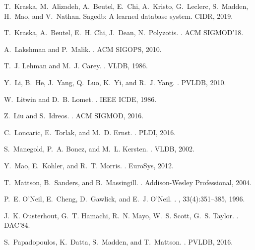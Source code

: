 \documentclass[11pt]{article}
\begin{document}
\begin{thebibliography}{10}
\begin{small}
T.~Kraska, M.~Alizadeh, A.~Beutel, E.~Chi, A.~Kristo, G.~Leclerc, S.~Madden,
  H.~Mao, and V.~Nathan.
\newblock Sagedb: A learned database system.
\newblock CIDR, 2019.

T.~Kraska, A.~Beutel, E.~H. Chi, J.~Dean, N.~Polyzotis.
.
\newblock ACM SIGMOD'18.

A.~Lakshman and P.~Malik.
.
\newblock ACM SIGOPS, 2010.

T.~J. Lehman and M.~J. Carey.
.
\newblock VLDB, 1986.

Y.~Li, B.~He, J.~Yang, Q.~Luo, K.~Yi, and R.~J. Yang.
.
\newblock PVLDB, 2010.

W.~Litwin and D.~B. Lomet.
.
\newblock IEEE ICDE, 1986.

Z.~Liu and S.~Idreos.
.
\newblock ACM SIGMOD, 2016.

C.~Loncaric, E.~Torlak, and M.~D. Ernst.
.
\newblock PLDI, 2016.

S.~Manegold, P.~A. Boncz, and M.~L. Kersten.
.
\newblock VLDB, 2002.

Y.~Mao, E.~Kohler, and R.~T. Morris.
.
\newblock EuroSys, 2012.

T.~Mattson, B.~Sanders, and B.~Massingill.
.
\newblock Addison-Wesley Professional, 2004.

P.~E. O'Neil, E.~Cheng, D.~Gawlick, and E.~J. O'Neil.
.
, 33(4):351--385, 1996.

J.~K. Ousterhout, G.~T. Hamachi, R.~N. Mayo, W.~S. Scott, G.~S. Taylor.
.
\newblock DAC'84.

S.~Papadopoulos, K.~Datta, S.~Madden, and T.~Mattson.
.
\newblock PVLDB, 2016.


\end{small}
\end{thebibliography}
\end{document}
